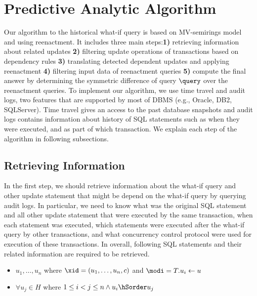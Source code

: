 \section{Predictive Analytic Algorithm}
\label{sec:impl-appr}
Our algorithm to the historical what-if query is based on MV-semirings model and using reenactment. It includes three main steps:\textbf{1)} retrieving information about related updates \textbf{2)} filtering update operations of transactions based on dependency rules \textbf{3)} translating detected dependent updates and applying reenactment \textbf{4)} filtering input data of reenactment queries \textbf{5)} compute the final answer by determining the symmetric difference of query $\query$ over the reenactment queries. To implement our algorithm, we use time travel and audit logs, two features that are supported by most of DBMS (e.g., Oracle, DB2, SQLServer). Time travel gives an access to the past database snapshots and audit logs contains information about history of SQL statements such as when they were executed, and as part of which transaction. We explain each step of the algorithm in following subsections.
\subsection{Retrieving Information}
\label{def:retrieve-info}
In the first step, we should retrieve information about the what-if query and other update statement that might be depend on the what-if query by querying audit logs. In particular, we need to know what was the original SQL statement and all other update statement that were executed by the same transaction, when each statement was executed, which statements were executed after the what-if query by other transactions, and what concurrency control protocol were used for execution of these transactions.
%
%
%
In overall, following SQL statements and their related information are required to be retrieved.
\begin{itemize}
\item $u_1, \ldots, u_n$ where $\xid = (u_1, \ldots, u_n, c)$ and $\modi = T.u_i \gets u$
\item $\forall u_j \in H$ where $1 \leq i < j \leq n \wedge u_i \hSorder u_j$
%
%
%
\end{itemize}
